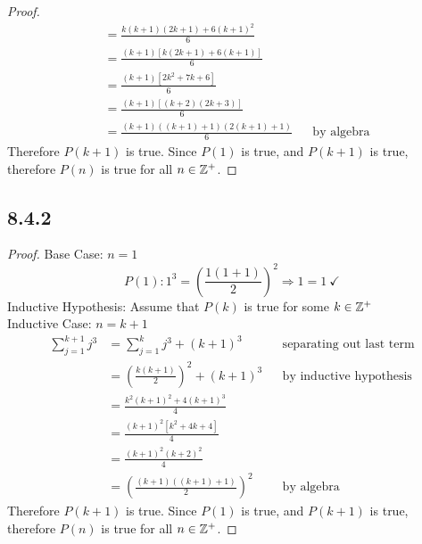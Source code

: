 \begin{enumerate}
\begin{proof}
\begin{align*}
                           & = \frac{k(k+1)(2k+1) + 6(k+1)^2}{6}                                       \\
                           & = \frac{(k+1)[k(2k+1) + 6(k+1)]}{6}                                       \\
                           & = \frac{(k+1)[2k^2 + 7k + 6]}{6}                                          \\
                           & = \frac{(k+1)[(k+2)(2k+3)]}{6}                                            \\
                           & = \frac{(k+1)((k+1)+1)(2(k+1)+1)}{6} &  & \text{by algebra}
    \end{align*}
    Therefore $P(k+1)$ is true. Since $P(1)$ is true, and $P(k+1)$ is true, therefore $P(n)$ is true for all $n \in \mathbb{Z}^+$.
  \end{proof}

\end{enumerate}

\subsection*{8.4.2}
\begin{enumerate}
  \begin{proof}
    Base Case: $n = 1$
    \[
      P(1): 1^3 = \left(\frac{1(1+1)}{2}\right)^2 \Rightarrow 1 = 1~\checkmark
    \]
    Inductive Hypothesis: Assume that $P(k)$ is true for some $k \in \mathbb{Z}^+$ \\
    Inductive Case: $n = k + 1$
    \begin{align*}
      \sum_{j=1}^{k+1} j^3 & = \sum_{j=1}^{k} j^3 + (k+1)^3              &  & \text{separating out last term} \\
                           & = \left(\frac{k(k+1)}{2}\right)^2 + (k+1)^3 &  & \text{by inductive hypothesis}  \\
                           & = \frac{k^2(k+1)^2 + 4(k+1)^3}{4}                                                \\
                           & = \frac{(k+1)^2[k^2 + 4k + 4]}{4}                                                \\
                           & = \frac{(k+1)^2(k+2)^2}{4}                                                       \\
                           & = \left(\frac{(k+1)((k+1)+1)}{2}\right)^2   &  & \text{by algebra}
    \end{align*}
    Therefore $P(k+1)$ is true. Since $P(1)$ is true, and $P(k+1)$ is true, therefore $P(n)$ is true for all $n \in \mathbb{Z}^+$.
  \end{proof}
\end{enumerate}

